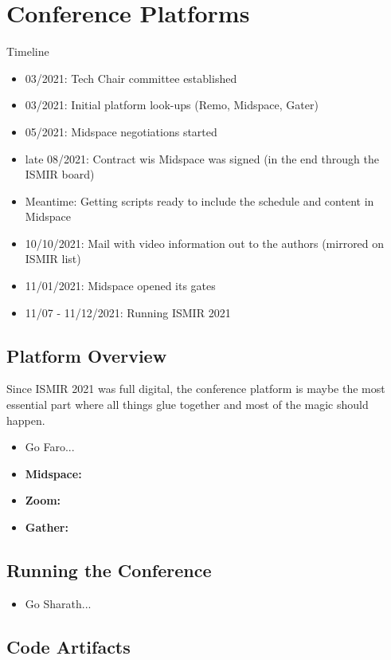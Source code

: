 \documentclass[%
10pt,								%
titlepage,						%
]
{scrartcl}
\begin{document}
\section{Conference Platforms}

Timeline
\begin{itemize}
    \item 03/2021: Tech Chair committee established
    \item 03/2021: Initial platform look-ups (Remo, Midspace, Gater)
    \item 05/2021: Midspace negotiations started
    \item late 08/2021: Contract wis Midspace was signed (in the end through the ISMIR board)
    \item Meantime: Getting scripts ready to include the schedule and content in Midspace
    \item 10/10/2021: Mail with video information out to the authors (mirrored on ISMIR list)
    \item 11/01/2021: Midspace opened its gates
    \item 11/07 - 11/12/2021: Running ISMIR 2021
\end{itemize}

\subsection{Platform Overview}

Since ISMIR 2021 was full digital, the conference platform is maybe the most essential part where all things glue together and most of the magic should happen.

\begin{itemize}
    \item Go Faro...
    \item \textbf{Midspace:}
    \item \textbf{Zoom:}
    \item \textbf{Gather:}
\end{itemize}

\subsection{Running the Conference}

\begin{itemize}
    \item Go Sharath...
\end{itemize}

\subsection{Code Artifacts}
\end{document}
